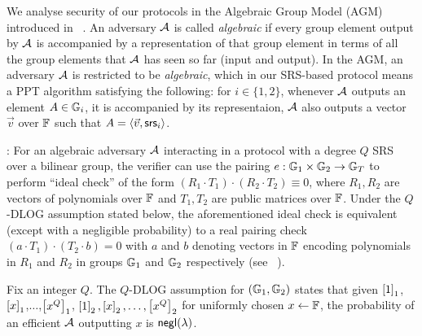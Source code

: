 We analyse security of our protocols in the Algebraic Group Model (AGM) introduced
in ~\cite{C:FucKilLos18}. An adversary $\mathcal{A}$ is called \textit{algebraic} if every group element output by $\mathcal{A}$ is accompanied by a representation of that group element in terms of all the group elements that $\mathcal{A}$ has seen so far (input and output).
In the AGM, an adversary $\mathcal{A}$ is restricted to be {\em algebraic}, which in our SRS-based protocol means a PPT algorithm satisfying the following:
for $i\in \{1,2\}$, whenever $\mathcal{A}$ outputs an element $A\in \mathbb{G}_i$, it is accompanied by its representaion, $\mathcal{A}$ also outputs a vector $\vec{v}$
	over $\mathbb{F}$ such that $A=\langle \vec{v},\mathsf{srs}_i\rangle$.

: For an algebraic adversary $\mathcal{A}$ interacting in a protocol with a degree $Q$ SRS over a bilinear group, the verifier
can use the pairing $e:\mathbb{G}_1\times \mathbb{G}_2\rightarrow \mathbb{G}_T$ to perform ``ideal check'' of the form $(R_1\cdot T_1)\cdot (R_2\cdot T_2)\equiv 0$, where $R_1,R_2$ are
vectors of polynomials over $\mathbb{F}$ and $T_1, T_2$ are public matrices over $\mathbb{F}$.
Under the $Q$-DLOG assumption stated below, the aforementioned ideal check
is equivalent (except with a negligible probability) to a real pairing check $(a\cdot T_1)\cdot (T_2\cdot b)=0$ with $a$ and $b$ denoting vectors in $\mathbb{F}$ encoding polynomials in $R_1$ and $R_2$ in
groups $\mathbb{G}_1$ and $\mathbb{G}_2$ respectively (see ~\cite[Lemma 2.2]{Gabizon2019PLONKPO}).
\begin{definition}\label{defn:q-dlog}
Fix an integer $Q$. The $Q$-DLOG assumption for $(\mathbb{G}_1,\mathbb{G}_2)$ states that given $\left[{1}\right]_1$,$\left[{x}\right]_1$,$\ldots$,$\left[{x^Q}\right]_1$, $\left[{1}\right]_2,\left[{x}\right]_2,\ldots,\left[{x^Q}\right]_2$ for
uniformly chosen $x\gets \mathbb{F}$, the probability of an efficient $\mathcal{A}$ outputting $x$ is $\mathsf{negl}(\lambda)$.
\end{definition}


